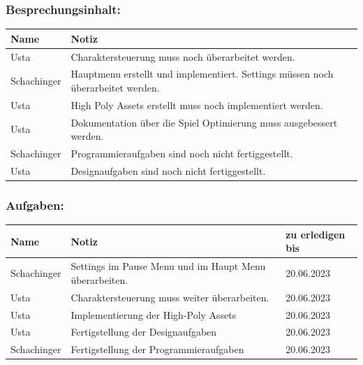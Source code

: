 \subsubsection*{Besprechungsinhalt:}
\begin{tabular}{|m{}|m{}|}
\hline
Name & Notiz \\
\hline
Usta & Charaktersteuerung muss noch überarbeitet werden. \\
\hline
Schachinger & Hauptmenu erstellt und implementiert. Settings müssen noch überarbeitet werden. \\
\hline
Usta & High Poly Assets erstellt muss noch implementiert werden. \\
\hline
Usta & Dokumentation über die Spiel Optimierung muss ausgebessert werden. \\
\hline
Schachinger & Programmieraufgaben sind noch nicht fertiggestellt. \\
\hline
Usta & Designaufgaben sind noch nicht fertiggestellt. \\
\hline
\end{tabular}

\subsubsection*{Aufgaben:}
\begin{tabular}{|m{}|m{}|m{}|}
\hline
Name & Notiz & zu erledigen bis \\
\hline
Schachinger & Settings im Pause Menu und im Haupt Menu überarbeiten. & 20.06.2023 \\
\hline
Usta & Charaktersteuerung muss weiter überarbeiten.  & 20.06.2023 \\
\hline
Usta & Implementierung der High-Poly Assets & 20.06.2023 \\
\hline
Usta & Fertigstellung der Designaufgaben & 20.06.2023 \\
\hline
Schachinger & Fertigstellung der Programmieraufgaben & 20.06.2023 \\
\hline
\end{tabular}


\pagebreak

